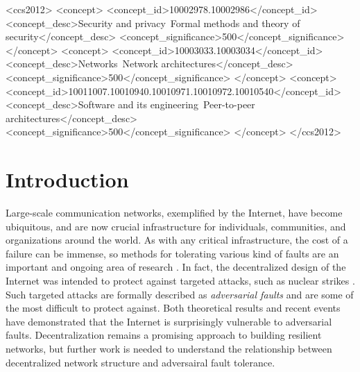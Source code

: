 \documentclass{sig-alternate-05-2015}
\begin{document}
%
%
\begin{CCSXML}
<ccs2012>
<concept>
<concept_id>10002978.10002986</concept_id>
<concept_desc>Security and privacy~Formal methods and theory of security</concept_desc>
<concept_significance>500</concept_significance>
</concept>
<concept>
<concept_id>10003033.10003034</concept_id>
<concept_desc>Networks~Network architectures</concept_desc>
<concept_significance>500</concept_significance>
</concept>
<concept>
<concept_id>10011007.10010940.10010971.10010972.10010540</concept_id>
<concept_desc>Software and its engineering~Peer-to-peer architectures</concept_desc>
<concept_significance>500</concept_significance>
</concept>
</ccs2012>
\end{CCSXML} 


%
%

%
%
\printccsdesc



\section{Introduction}

Large-scale communication networks, exemplified by the Internet,
have become ubiquitous, and are now crucial infrastructure for
individuals, communities, and organizations around the world.
As with any critical infrastructure, the cost of a failure can be
immense, so methods for tolerating various kind of faults are an
important and ongoing area of research
\cite{zin_survey_2015,albert_error_2000,sterbenz_resilience_2010}.
In fact, the decentralized design of the Internet was intended to protect
against targeted attacks, such as nuclear strikes
\cite{baran_distributed_1964}.
Such targeted attacks are formally described as {\em adversarial faults}
and are some of the most difficult to protect against.
Both theoretical results and recent events have demonstrated that
the Internet is surprisingly vulnerable to adversarial faults.
Decentralization remains a promising approach to building resilient networks,
but further work is needed to understand the relationship between
decentralized network structure and adversairal fault tolerance.
\end{document}
